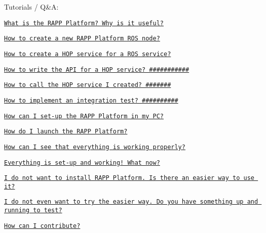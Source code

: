 Tutorials / Q\&A\-:
\begin{DoxyItemize}
\item \href{https://github.com/rapp-project/rapp-platform/wiki/What-is-the-RAPP-Platform%3F-Why-is-it-useful%3F}{\tt What is the R\-A\-P\-P Platform? Why is it useful?}
\item \href{https://github.com/rapp-project/rapp-platform/wiki/How-to-create-a-new-RAPP-Platform-ROS-node%3F}{\tt How to create a new R\-A\-P\-P Platform R\-O\-S node?}
\item \href{https://github.com/rapp-project/rapp-platform/wiki/How-to-create-a-HOP-service-for-a-ROS-service%3F}{\tt How to create a H\-O\-P service for a R\-O\-S service?}
\item \href{https://github.com/rapp-project/rapp-platform/wiki/How-to-write-the-API-for-a-HOP-service%3F}{\tt How to write the A\-P\-I for a H\-O\-P service? \#\#\#\#\#\#\#\#\#\#\#}
\item \href{https://github.com/rapp-project/rapp-platform/wiki/How-to-call-the-HOP-service-I-created%3F}{\tt How to call the H\-O\-P service I created? \#\#\#\#\#\#\#}
\item \href{https://github.com/rapp-project/rapp-platform/wiki/How-to-implement-an-integration-test%3F}{\tt How to implement an integration test? \#\#\#\#\#\#\#\#\#\#}
\item \href{https://github.com/rapp-project/rapp-platform/wiki/How-can-I-set-up-the-RAPP-Platform-in-my-PC%3F}{\tt How can I set-\/up the R\-A\-P\-P Platform in my P\-C?}
\item \href{https://github.com/rapp-project/rapp-platform/wiki/How-do-I-launch-the-RAPP-Platform%3F}{\tt How do I launch the R\-A\-P\-P Platform?}
\item \href{https://github.com/rapp-project/rapp-platform/wiki/How-can-I-see-that-everything-is-working-properly%3F}{\tt How can I see that everything is working properly?}
\item \href{https://github.com/rapp-project/rapp-platform/wiki/Everything-is-set-up-and-working!-What-now%3F}{\tt Everything is set-\/up and working! What now?}
\item \href{https://github.com/rapp-project/rapp-platform/wiki/I-do-not-want-to-install-RAPP-Platform.-Is-there-an-easier-way-to-use-it%3F}{\tt I do not want to install R\-A\-P\-P Platform. Is there an easier way to use it?}
\item \href{https://github.com/rapp-project/rapp-platform/wiki/I-do-not-even-want-to-try-the-easier-way.-Do-you-have-something-up-and-running-to-test%3F}{\tt I do not even want to try the easier way. Do you have something up and running to test?}
\item \href{https://github.com/rapp-project/rapp-platform/wiki/How-can-I-contribute%3F}{\tt How can I contribute?} 
\end{DoxyItemize}